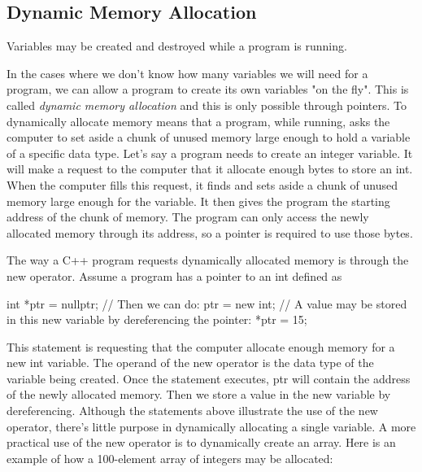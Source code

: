 \documentclass{report}
\begin{document}
    \bigbreak \noindent 
    \subsection{Dynamic Memory Allocation}
    \bigbreak \noindent 
    \begin{concept}
 Variables may be created and destroyed while a program is running.
	\end{concept}
    \bigbreak \noindent 
    In the cases where we don't know how many variables we will need for a program, we can allow a program to create its own variables "on the fly". This is called \textit{dynamic memory allocation} and this is only possible through pointers.
    \bigbreak \noindent 
    To dynamically allocate memory means that a program, while running, asks the computer
to set aside a chunk of unused memory large enough to hold a variable of a specific data
type. Let’s say a program needs to create an integer variable. It will make a request to the
computer that it allocate enough bytes to store an int. When the computer fills this request,
it finds and sets aside a chunk of unused memory large enough for the variable. It then gives
the program the starting address of the chunk of memory. The program can only access the
newly allocated memory through its address, so a pointer is required to use those bytes.

    \bigbreak \noindent 
    The way a C++ program requests dynamically allocated memory is through the new operator. Assume a program has a pointer to an int defined as
    \bigbreak \noindent 
    
    \begin{cppcode}
int *ptr = nullptr;
// Then we can do:
ptr = new int;
// A value may be stored in this new variable by dereferencing the pointer:
*ptr = 15;
    \end{cppcode}
    

    \bigbreak \noindent 
    This statement is requesting that the computer allocate enough memory for a new int variable. The operand of the new operator is the data type of the variable being created. Once the statement executes, ptr will contain the address of the newly allocated memory. Then we store a value in the new variable by dereferencing.
    \bigbreak \noindent 
    Although the statements above illustrate the use of the new operator, there’s little purpose
in dynamically allocating a single variable. A more practical use of the new operator is to
dynamically create an array. Here is an example of how a 100-element array of integers
may be allocated:
\bigbreak \noindent 
\end{document}
